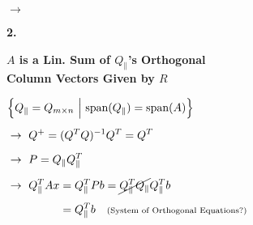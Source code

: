 \documentclass[12pt]{article}
\begin{document}
\begin{minipage}[t]{.49\textwidth}
	\vspace{15pt}
	\(\rightarrow\) 
\end{minipage}
\vline
\hfill
\begin{minipage}[t]{.48\textwidth}
	\textbf{2.} \hspace{5pt} \begin{minipage}[t]{7cm}
		\textbf{\(A\) is a Lin. Sum of \(Q_\parallel\)'s Orthogonal}\\[3pt]
		\textbf{Column Vectors Given by \(R\)}
	\end{minipage}

	\vspace{15pt}
	\(\begin{aligned}
		&\Big\{ Q_\parallel = Q_{m \times n}\ \Big|\ \text{span}(Q_\parallel) = \text{span}(A) \Big\} \\[5pt]
		&\rightarrow\ Q^+ = (Q^T Q)^{-1} Q^T = Q^T\\[5pt]
		&\rightarrow\ P = Q_\parallel Q_\parallel^T\\[5pt]
		&\rightarrow\ \begin{aligned}[t]
				Q_\parallel^T Ax &= Q_\parallel^T Pb = \cancel{Q_\parallel^T Q_\parallel} Q_\parallel^T b \\[4pt]
				&= Q_\parallel^T b \hspace{10pt} \text{\scriptsize(System of Orthogonal Equations?)}
			\end{aligned}
	\end{aligned}\)


\end{minipage}
\end{document}
